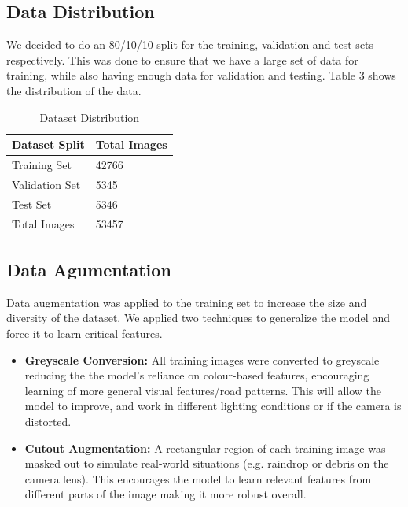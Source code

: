 \documentclass{article} %
\begin{document}
\subsection{Data Distribution}
We decided to do an 80/10/10 split for the training, validation and test sets respectively. This was done to ensure that we have a
large set of data for training, while also having enough data for validation and testing. Table 3 shows the distribution of the data.

\begin{table}[h]
\centering
\caption{Dataset Distribution}
\vspace{0.5em}
\begin{tabular}{|p{2cm}|p{2cm}|}
\hline
\textbf{Dataset Split} & \textbf{Total Images} \\ \hline
Training Set           & 42766 \\ \hline
Validation Set         & 5345 \\ \hline
Test Set               & 5346 \\ \hline
Total Images           & 53457  \\ \hline
\end{tabular}
\end{table}


\subsection{Data Agumentation}

Data augmentation was applied to the training set to increase the size and diversity of the dataset. We applied two techniques to generalize  the model and force
it to learn critical features. 

\begin{itemize}
  \item \textbf{Greyscale Conversion:} All training images were converted to greyscale reducing the the model's reliance on colour-based features, encouraging learning of more general visual features/road patterns. This will allow the model to improve, and work in different lighting conditions or if the camera is distorted.

  \item \textbf{Cutout Augmentation:} A rectangular region of each training image was masked out to simulate real-world situations (e.g. raindrop or debris on the camera lens). This encourages the model to learn relevant features from different parts of the image making it more robust overall. 
\end{itemize}
\end{document}

